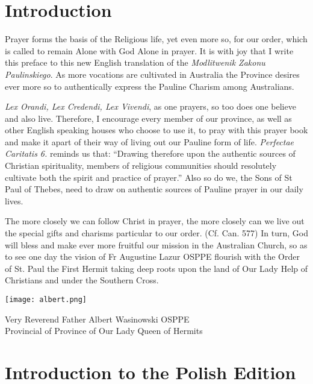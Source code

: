 
\section*{Introduction}

\setlength{\parskip}{1em}

Prayer forms the basis of the Religious life, yet even more so, for our order, which is called to remain Alone with God Alone in prayer. It is with joy that I write this preface to this new English translation of the \textit{Modlitwenik Zakonu Paulinskiego}. As more vocations are cultivated in Australia the Province desires ever more so to authentically express the Pauline Charism among Australians.

\textit{Lex Orandi, Lex Credendi, Lex Vivendi}, as one prayers, so too does one believe and also live. Therefore, I encourage every member of our province, as well as other English speaking houses who choose to use it, to pray with this prayer book and make it apart of their way of living out our Pauline form of life. \textit{Perfectae Caritatis 6.} reminds us that: ``Drawing therefore upon the authentic sources of Christian spirituality, members of religious communities should resolutely cultivate both the spirit and practice of prayer.''  Also so do we, the Sons of St Paul of Thebes, need to draw on authentic sources of Pauline prayer in our daily lives.

The more closely we can follow Christ in prayer, the more closely can we live out the special gifts and charisms particular to our order. (Cf. Can. 577) In turn, God will bless and make ever more fruitful our mission in the Australian Church, so as to see one day the vision of Fr Augustine Lazur OSPPE flourish with the Order of St. Paul the First Hermit taking deep roots upon the land of Our Lady Help of Christians and under the Southern Cross.

\begin{flushright}
    \texttt{[image: albert.png]}

    Very Reverend Father Albert Wasinowski OSPPE \\
    Provincial of Province of Our Lady Queen of Hermits
\end{flushright}

\section*{Introduction to the Polish Edition}

